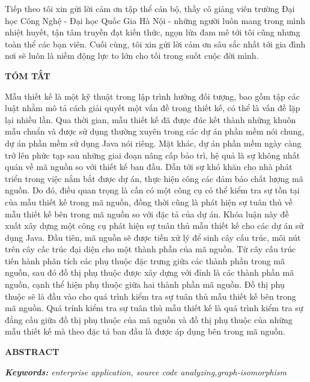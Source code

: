 \documentclass[12pt]{report}
\begin{document}
\noindent Tiếp theo tôi xin gửi lời cảm ơn tập thể cán bộ, thầy cô giảng viên trường Đại học Công Nghệ - Đại học Quốc Gia Hà Nội - những người luôn mang trong mình nhiệt huyết, tận tâm truyền đạt kiến thức, ngọn lửa đam mê tới tôi cũng nhưng toàn thể các bạn viên. Cuối cùng, tôi xin gửi lời cảm ơn sâu sắc nhất tới gia đình nơi sẽ luôn là niềm động lực to lớn cho tối trong suốt cuộc đời mình.

	
\newpage
\begin{center}
	\textbf{\large TÓM TẮT}
\end{center}
Mẫu thiết kế là một kỹ thuật trong lập trình hướng đối tượng, bao gồm tập các luật nhằm mô tả cách giải quyết một vấn đề trong thiết kế, có thể là vấn đề lặp lại nhiều lần. Qua thời gian, mẫu thiết kế đã được đúc kết thành những khuôn mẫu chuẩn và được sử dụng thường xuyên trong các dự án phần mềm nói chung, dự án phần mềm sử dụng Java nói riêng. Mặt khác, dự án phần mềm ngày càng trở lên phức tạp sau những giai đoạn nâng cấp bảo trì, hệ quả là sự không nhất quán về mã nguồn so với thiết kế ban đầu. Dẫn tới sự khó khăn cho nhà phát triển trong việc nắm bắt được dự án, thực hiện công các đảm bảo chất lượng mã nguồn. Do đó, điều quan trọng là cần có một công cụ có thể kiểm tra sự tồn tại của mẫu thiết kế trong mã nguồn, đồng thời cũng là phát hiện sự tuân thủ về mẫu thiết kế bên trong mã nguồn so với đặc tả của dự án. Khóa luận này đề xuất xây dựng một công cụ phát hiện sự tuân thủ mẫu thiết kế cho các dự án sử dụng Java. Đầu tiên, mã nguồn sẽ được tiền xử lý để sinh cây cấu trúc, môi nút trên cây cấc trúc đại diện cho một thành phần của mã nguồn. Từ cây cấu trúc tiến hành phân tích các phụ thuộc đặc trưng giữa các thành phần trong mã nguồn, sau đó đồ thị phụ thuộc được xây dựng với đỉnh là các thành phần mã nguồn, cạnh thể hiện phụ thuộc giữa hai thành phần mã nguồn. Đồ thị phụ thuộc sẽ là đầu vào cho quá trình kiểm tra sự tuân thủ mẫu thiết kế bên trong mã nguồn. Quá trính kiểm tra sự tuân thủ mẫu thiết kế là quá trình kiểm tra sự đẳng cấu giữa đồ thị phụ thuộc của mã nguồn và đồ thị phụ thuộc của những mẫu thiết kế mà theo đặc tả ban đầu là được áp dụng bên trong mã nguồn.

\newpage
\begin{center}
	\textbf{\large ABSTRACT}
\end{center}


	\noindent \textit{\textbf{Keywords:} enterprise application, source code analyzing,graph-isomorphism}
\end{document}
